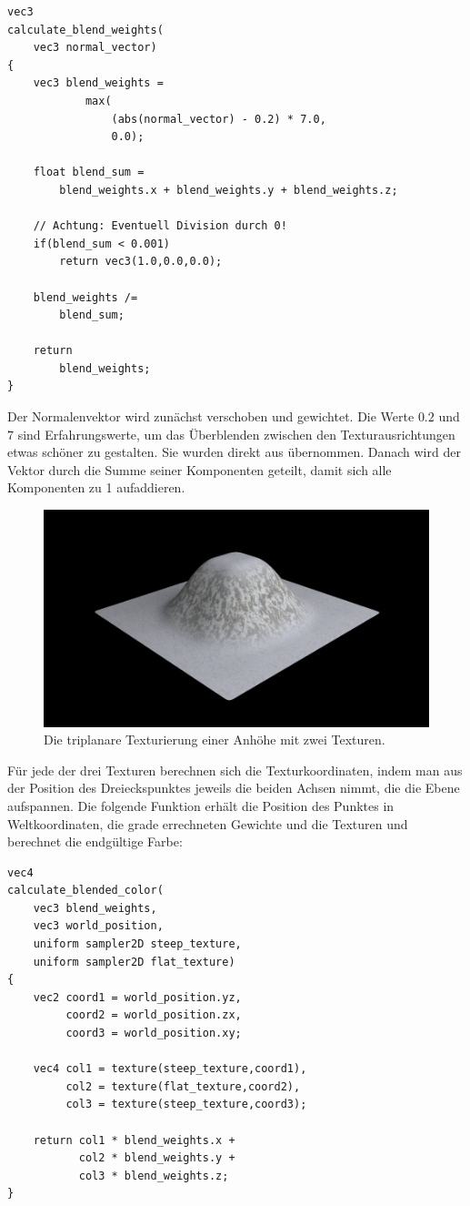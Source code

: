 \begin{verbatim}
vec3
calculate_blend_weights(
    vec3 normal_vector)
{
    vec3 blend_weights =
            max(
                (abs(normal_vector) - 0.2) * 7.0,
                0.0);

    float blend_sum =
        blend_weights.x + blend_weights.y + blend_weights.z;

    // Achtung: Eventuell Division durch 0!
    if(blend_sum < 0.001)
        return vec3(1.0,0.0,0.0);

    blend_weights /=
        blend_sum;

    return
        blend_weights;
}
\end{verbatim}

Der Normalenvektor wird zunächst verschoben und gewichtet. Die Werte
$0.2$ und $7$ sind Erfahrungswerte, um das Überblenden zwischen den
Texturausrichtungen etwas schöner zu gestalten. Sie wurden direkt aus
\cite{Nguyen:2007:GG:1407436} übernommen. Danach wird der Vektor durch
die Summe seiner Komponenten geteilt, damit sich alle Komponenten zu 1
aufaddieren.

\begin{figure}[h]
\centering
\includegraphics[width=12cm]{images/triplanar_mountain}
\caption{Die triplanare Texturierung einer Anhöhe mit zwei Texturen.}
\label{fig:implementation_fallen_snow_triplanar_mountain}
\end{figure}

Für jede der drei Texturen berechnen sich die Texturkoordinaten, indem
man aus der Position des Dreieckspunktes jeweils die beiden Achsen
nimmt, die die Ebene aufspannen. Die folgende Funktion erhält die
Position des Punktes in Weltkoordinaten, die grade errechneten
Gewichte und die Texturen und berechnet die endgültige Farbe:

\begin{verbatim}
vec4
calculate_blended_color(
    vec3 blend_weights,
    vec3 world_position,
    uniform sampler2D steep_texture,
    uniform sampler2D flat_texture)
{
    vec2 coord1 = world_position.yz,
         coord2 = world_position.zx,
         coord3 = world_position.xy;

    vec4 col1 = texture(steep_texture,coord1),
         col2 = texture(flat_texture,coord2),
         col3 = texture(steep_texture,coord3);

    return col1 * blend_weights.x +
           col2 * blend_weights.y +
           col3 * blend_weights.z;
}
\end{verbatim}

